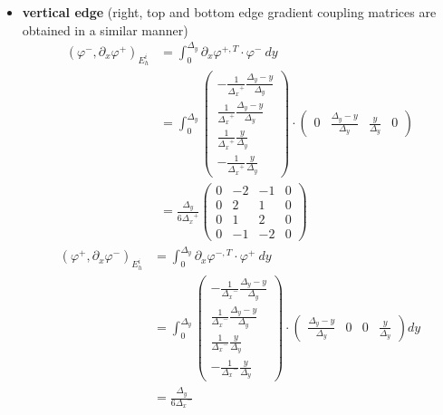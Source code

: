 \documentclass{mc2013}
\newcommand\bs{\boldsymbol}
\newcommand\tf{\varphi}
\renewcommand{\(}{\left(}
\renewcommand{\)}{\right)}
\renewcommand{\[}{\left[}
\renewcommand{\]}{\right]}
\begin{document}
\begin{itemize}
\item {\bf vertical edge} (right, top and bottom edge gradient coupling matrices are obtained in a similar manner)  %
\begin{equation}
\begin{split}
\(\tf^-,\partial_x \tf^{+}\)_{E_h^i} & = \int_0^{\Delta _y} \partial_x \tf^{+,T}\cdot
\tf^-\ dy\\
&= \int_0^{\Delta _y}
\begin{pmatrix}
-\frac{1}{{\Delta _x}^+} \frac{{\Delta _y}-y}{{\Delta _y}} \\
\frac{1}{{\Delta _x}^+} \frac{{\Delta _y}-y}{{\Delta _y}} \\
\frac{1}{{\Delta _x}^+} \frac{y}{{\Delta _y}} \\
-\frac{1}{{\Delta _x}^+} \frac{y}{{\Delta _y}} 
\end{pmatrix}
\cdot
\begin{pmatrix}
0 & \frac{{\Delta _y}-y}{{\Delta _y}} & \frac{y}{{\Delta _y}} & 0
\end{pmatrix}\\
&= \frac{{\Delta _y}}{6{\Delta _x}^+}
\begin{pmatrix}
0 & -2 & -1 & 0 \\
0 & 2 & 1 & 0 \\
0 & 1 & 2 & 0 \\
0 & -1 & -2 & 0
\end{pmatrix}
\end{split}
\end{equation}
\begin{equation}
\begin{split}
\(\tf^+,\partial_x \tf^{-}\)_{E_h^i} &= \int_0^{{\Delta _y}} \partial_x \tf^{-,T}\cdot
\tf^+\ dy\\
& = \int_0^{\Delta _y} 
\begin{pmatrix}
-\frac{1}{{\Delta _x}^-} \frac{{\Delta _y}-y}{{\Delta _y}} \\
\frac{1}{{\Delta _x}^-} \frac{{\Delta _y}-y}{{\Delta _y}} \\
\frac{1}{{\Delta _x}^-} \frac{y}{{\Delta _y}} \\
-\frac{1}{{\Delta _x}^-} \frac{y}{{\Delta _y}}
\end{pmatrix}
\cdot
\begin{pmatrix}
\frac{{\Delta _y}-y}{{\Delta _y}} & 0 & 0 & \frac{y}{{\Delta _y}}
\end{pmatrix}
dy\\
&= \frac{{\Delta _y}}{6{\Delta _x}^-} 

\end{split}
\end{equation}
\end{itemize}
\end{document}
